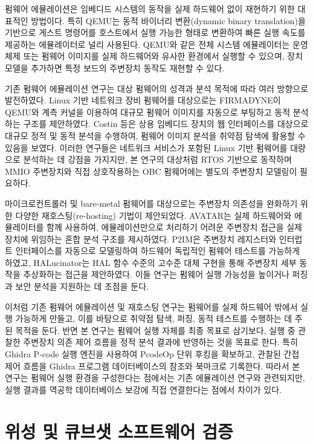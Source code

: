 \documentclass[master,korean,final]{kaist-ucs}
\begin{document}
펌웨어 에뮬레이션은 임베디드 시스템의 동작을 실제 하드웨어 없이 재현하기 위한 대표적인 방법이다. 특히 QEMU는 동적 바이너리 변환(dynamic binary translation)을 기반으로 게스트 명령어를 호스트에서 실행 가능한 형태로 변환하여 빠른 실행 속도를 제공하는 에뮬레이터로 널리 사용된다\cite{QEMU}. QEMU와 같은 전체 시스템 에뮬레이터는 운영체제 또는 펌웨어 이미지를 실제 하드웨어와 유사한 환경에서 실행할 수 있으며, 장치 모델을 추가하면 특정 보드의 주변장치 동작도 재현할 수 있다.

기존 펌웨어 에뮬레이션 연구는 대상 펌웨어의 성격과 분석 목적에 따라 여러 방향으로 발전하였다. Linux 기반 네트워크 장비 펌웨어를 대상으로는 FIRMADYNE이 QEMU와 계측 커널을 이용하여 대규모 펌웨어 이미지를 자동으로 부팅하고 동적 분석하는 구조를 제안하였다\cite{Firmadyne}. Costin 등은 상용 임베디드 장치의 웹 인터페이스를 대상으로 대규모 정적 및 동적 분석을 수행하여, 펌웨어 이미지 분석을 취약점 탐색에 활용할 수 있음을 보였다\cite{CostinFirmware}. 이러한 연구들은 네트워크 서비스가 포함된 Linux 기반 펌웨어를 대량으로 분석하는 데 강점을 가지지만, 본 연구의 대상처럼 RTOS 기반으로 동작하며 MMIO 주변장치와 직접 상호작용하는 OBC 펌웨어에는 별도의 주변장치 모델링이 필요하다.

마이크로컨트롤러 및 bare-metal 펌웨어를 대상으로는 주변장치 의존성을 완화하기 위한 다양한 재호스팅(re-hosting) 기법이 제안되었다. AVATAR는 실제 하드웨어와 에뮬레이터를 함께 사용하여, 에뮬레이션만으로 처리하기 어려운 주변장치 접근을 실제 장치에 위임하는 혼합 분석 구조를 제시하였다\cite{Avatar}. P2IM은 주변장치 레지스터와 인터럽트 인터페이스를 자동으로 모델링하여 하드웨어 독립적인 펌웨어 테스트를 가능하게 하였고\cite{P2IM}, HALucinator는 HAL 함수 수준의 고수준 대체 구현을 통해 주변장치 세부 동작을 추상화하는 접근을 제안하였다\cite{HALucinator}. 이들 연구는 펌웨어 실행 가능성을 높이거나 퍼징과 보안 분석을 지원하는 데 초점을 둔다.

이처럼 기존 펌웨어 에뮬레이션 및 재호스팅 연구는 펌웨어를 실제 하드웨어 밖에서 실행 가능하게 만들고, 이를 바탕으로 취약점 탐색, 퍼징, 동적 테스트를 수행하는 데 주된 목적을 둔다. 반면 본 연구는 펌웨어 실행 자체를 최종 목표로 삼기보다, 실행 중 관찰한 주변장치 의존 제어 흐름을 정적 분석 결과에 반영하는 것을 목표로 한다. 특히 Ghidra P-code 실행 엔진을 사용하여 PcodeOp 단위 후킹을 확보하고, 관찰된 간접 제어 흐름을 Ghidra 프로그램 데이터베이스의 참조와 북마크로 기록한다. 따라서 본 연구는 펌웨어 실행 환경을 구성한다는 점에서는 기존 에뮬레이션 연구와 관련되지만, 실행 결과를 역공학 데이터베이스 보강에 직접 연결한다는 점에서 차이가 있다.

\section{위성 및 큐브샛 소프트웨어 검증}
\end{document}
